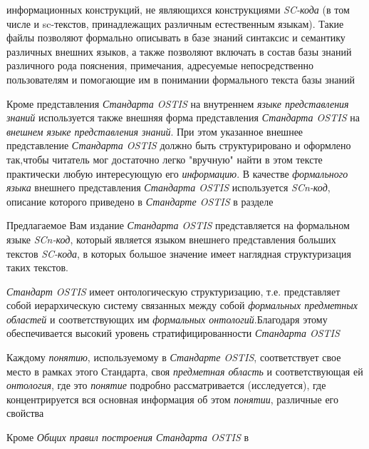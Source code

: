 \begin{SCn}
{\begin{scnvector}
{			            информационных конструкций, не являющихся конструкциями \textit{SC-кода} (в том
			            числе и sc-текстов, принадлежащих различным естественным языкам). Такие файлы
			            позволяют формально описывать в базе знаний синтаксис и семантику различных
			            внешних языков, а также позволяют включать в состав базы знаний различного рода
			            пояснения, примечания, адресуемые непосредственно пользователям и помогающие им
			            в понимании формального текста базы знаний}
			\item{Кроме представления \textit{Стандарта OSTIS} на внутреннем
			\textit{языке представления знаний} используется также внешняя форма
			представления \textit{Стандарта OSTIS} на \textit{внешнем языке представления
				знаний}. При этом указанное внешнее представление \textit{Стандарта OSTIS}
			должно быть структурировано и оформлено так,чтобы читатель мог достаточно легко
			"вручную"{} найти в этом тексте практически любую интересующую его
			\textit{информацию}. В качестве \textit{формального языка} внешнего
			представления \textit{Стандарта OSTIS} используется \textit{SCn-код}, описание
			которого приведено в \textit{Стандарте OSTIS} в разделе }
			\item{Предлагаемое Вам издание \textit{Стандарта OSTIS}
			            представляется на формальном языке \textit{SCn-код}, который является языком
			            внешнего представления больших текстов \textit{SC-кода}, в которых большое
			            значение имеет наглядная структуризация таких текстов.}
			\item{\textit{Стандарт OSTIS} имеет онтологическую
			            структуризацию, т.е. представляет собой иерархическую систему связанных между
			            собой \textit{формальных предметных областей} и соответствующих им
			            \textit{формальных онтологий}.Благодаря этому обеспечивается высокий уровень
			            стратифицированности \textit{Стандарта OSTIS}}
			\item{Каждому \textit{понятию}, используемому в
			            \textit{Стандарте OSTIS}, соответствует свое место в рамках этого Стандарта,
			            своя \textit{предметная область} и соответствующая ей \textit{онтология}, где
			            это \textit{понятие} подробно рассматривается (исследуется), где
			            концентрируется вся основная информация об этом \textit{понятии}, различные его
			            свойства}
			\item{Кроме \textit{Общих правил построения Стандарта OSTIS} в
}
\end{scnvector}}
\end{SCn}
